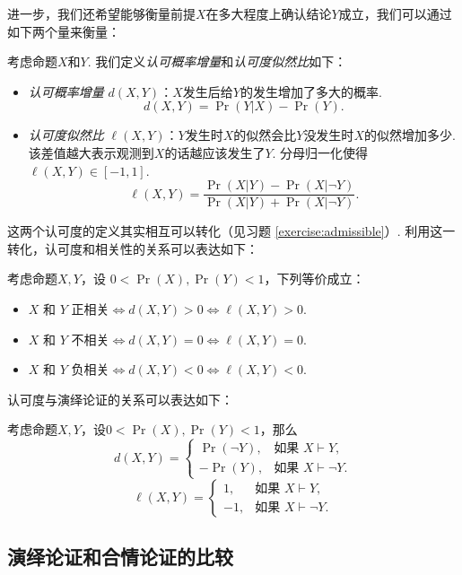 进一步，我们还希望能够衡量前提$X$在多大程度上确认结论$Y$成立，我们可以通过如下两个量来衡量：
\begin{definition}[认可度]
考虑命题$X$和$Y$. 我们定义\textit{认可概率增量}和\textit{认可度似然比}如下：
\begin{itemize}
\item \textit{认可概率增量} $d(X, Y)$：$X$发生后给$Y$的发生增加了多大的概率.
\[
    d(X, Y) = \Pr(Y|X) - \Pr(Y).
\]
\item \textit{认可度似然比} $\ell(X, Y)$：$Y$发生时$X$的似然会比$Y$没发生时$X$的似然增加多少. 该差值越大表示观测到$X$的话越应该发生了$Y$. 分母归一化使得$\ell(X,Y)\in[-1,1]$.
\[
    \ell(X, Y) = \frac{\Pr(X|Y) - \Pr(X|\neg Y)}{\Pr(X|Y) + \Pr(X|\neg Y)}.
\]
\end{itemize} 
\end{definition}

这两个认可度的定义其实相互可以转化（见习题 \ref{exercise:admissible}）. 利用这一转化，认可度和相关性的关系可以表达如下：
\begin{proposition}
    考虑命题$X,Y$，设 $0< \Pr(X),\Pr(Y) < 1$，下列等价成立：
    \begin{itemize}
        \item $X$ 和 $Y$ 正相关$\iff d(X,Y) > 0\iff \ell(X, Y) > 0$.
        \item $X$ 和 $Y$ 不相关$\iff d(X, Y) = 0\iff \ell(X, Y) = 0$. 
        \item $X$ 和 $Y$ 负相关$\iff d(X,Y) < 0\iff\ell(X, Y) < 0$.
    \end{itemize}    
\end{proposition}

认可度与演绎论证的关系可以表达如下：
\begin{proposition}
    考虑命题$X,Y$，设$0< \Pr(X),\Pr(Y) < 1$，那么
    \[
        d(X, Y) =
        \begin{cases}
            \Pr(\neg Y),& \text{如果 } X \vdash Y, \\
            -\Pr(Y),& \text{如果 } X \vdash \neg Y.
        \end{cases}
    \]
    \[\ell(X, Y) = 
        \begin{cases}
            1,& \text{如果 } X \vdash Y, \\
            -1,& \text{如果 } X \vdash \neg Y.
        \end{cases}
    \]
\end{proposition}


\subsection{演绎论证和合情论证的比较}

